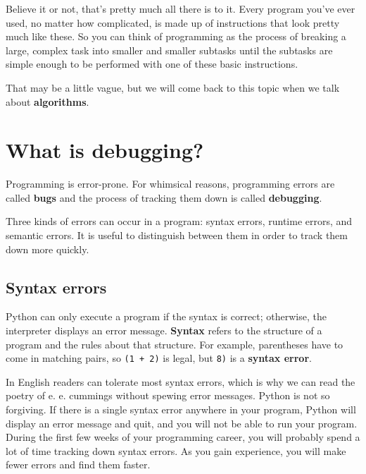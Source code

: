 \documentclass[10pt]{book}
\begin{document}
Believe it or not, that's pretty much all there is to it.  Every
program you've ever used, no matter how complicated, is made up of
instructions that look pretty much like these.  So you can think of
programming as the process of breaking a large, complex task
into smaller and smaller subtasks until the subtasks are
simple enough to be performed with one of these basic instructions.


That may be a little vague, but we will come back to this topic
when we talk about {\bf algorithms}.

\section{What is debugging?}

Programming is error-prone.  For whimsical reasons, programming errors
are called {\bf bugs} and the process of tracking them down is called
{\bf debugging}.


Three kinds of errors can occur in a program: syntax errors, runtime 
errors, and semantic errors. It is useful
to distinguish between them in order to track them down more quickly.

\subsection{Syntax errors}

Python can only execute a program if the syntax is
correct; otherwise, the interpreter displays an error message.
{\bf Syntax} refers to the structure of a program and the rules about
that structure.  
For example, parentheses have to come in matching pairs, so
{\tt (1 + 2)} is legal, but {\tt 8)} is a {\bf syntax error}.


In English readers can tolerate most syntax errors, which is why we
can read the poetry of e. e. cummings without spewing error messages.
Python is not so forgiving.  If there is a single syntax error
anywhere in your program, Python will display an error message and quit,
and you will not be able to run your program. During the first few
weeks of your programming career, you will probably spend a lot of
time tracking down syntax errors.  As you gain experience, you will
make fewer errors and find them faster.
\end{document}
